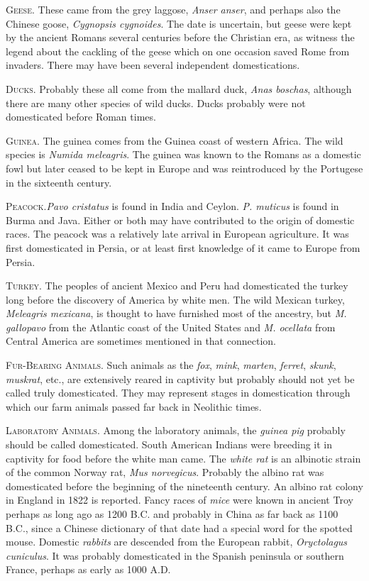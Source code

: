 \textsc{Geese}. These came from the grey laggose, \textit{Anser anser}, and perhaps also the Chinese goose,
\textit{Cygnopsis cygnoides}. The date is uncertain, but geese were kept by the ancient Romans several centuries
before the Christian era, as witness the legend about the cackling of the geese which on one occasion saved Rome
from invaders. There may have been several independent domestications.

\textsc{Ducks}. Probably these all come from the mallard duck, \textit{Anas boschas}, although there are many other 
species of wild ducks. Ducks probably were not domesticated before Roman times. 

\textsc{Guinea}. The guinea comes from the Guinea coast of western Africa. The wild species is
\textit{Numida meleagris}. The guinea was known to the Romans as a domestic fowl but later ceased to be kept in
Europe and was reintroduced by the Portugese in the sixteenth century.
 
\textsc{Peacock}.\textit{Pavo cristatus} is found in India and Ceylon. \textit{P. muticus} is found in Burma and
Java. Either or both may have contributed to the origin of domestic races. The peacock was a relatively late arrival
in European agriculture. It was first domesticated in Persia, or at least first knowledge of it came to Europe from 
Persia. 

\textsc{Turkey}. The peoples of ancient Mexico and Peru had domesticated the turkey long before the discovery of
America by white men. The wild Mexican turkey, \textit{Meleagris mexicana}, is thought to have furnished 
most of the ancestry, but \textit{M. gallopavo} from the Atlantic coast of the United States and \textit{M. ocellata} 
from Central America are sometimes mentioned in that connection. 

\textsc{Fur-Bearing Animals}. Such animals as the \textit{fox}, \textit{mink}, \textit{marten}, \textit{ferret},
\textit{skunk}, \textit{muskrat}, etc., are extensively reared in captivity but probably should not yet be called
truly domesticated. They may represent stages in domestication through which our farm animals passed far back in
Neolithic times.

\textsc{Laboratory Animals}. Among the laboratory animals, the \textit{guinea pig} probably should be called
domesticated. South American Indians were breeding it in captivity for food before the white man came. The
\textit{white rat} is an albinotic strain  of the common Norway rat, \textit{Mus norvegicus}. Probably the albino rat
was domesticated before the beginning of the nineteenth century. An albino rat colony in England in 1822 is reported. 
Fancy races of \textit{mice} were known in ancient Troy perhaps as long ago as 1200 B.C. and probably in China as far
back as 1100 B.C., since a Chinese dictionary of that date had a special word for the spotted mouse. Domestic
\textit{rabbits} are descended from the European rabbit, \textit{Oryctolagus cuniculus}. It was probably domesticated
in the Spanish peninsula or southern France, perhaps as early as 1000 A.D. 

